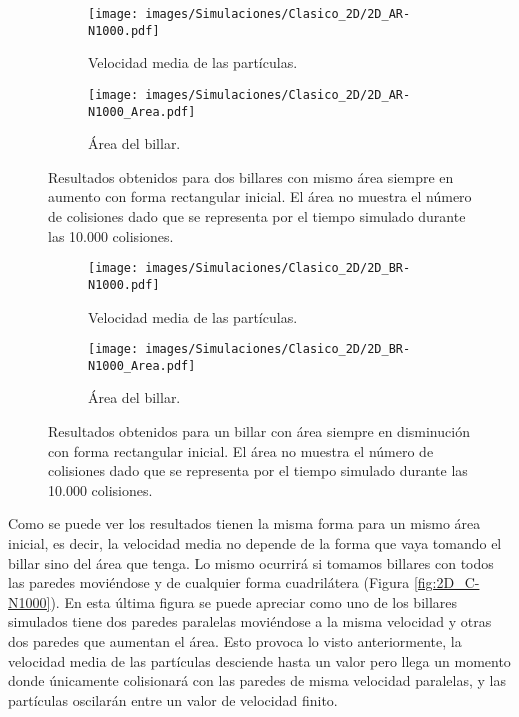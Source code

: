 \documentclass[11pt, spanish]{book}
\begin{document}
\begin{figure}[H]
    \begin{subfigure}[b]{0.5\textwidth}
        \centering
        \texttt{[image: images/Simulaciones/Clasico\_2D/2D\_AR-N1000.pdf]}
        \caption{Velocidad media de las partículas.}
    \end{subfigure}
    \hfill
    \begin{subfigure}[b]{0.5\textwidth}
        \centering
        \texttt{[image: images/Simulaciones/Clasico\_2D/2D\_AR-N1000\_Area.pdf]}
        \caption{Área del billar.}
    \end{subfigure}
    \caption{Resultados obtenidos para dos billares con mismo área siempre en aumento con forma rectangular inicial. El área no muestra el número de colisiones dado que se representa por el tiempo simulado durante las 10.000 colisiones.}
    \label{fig:2D_AR-N1000_con_Area}
\end{figure}

\begin{figure}[h]
    \begin{subfigure}[b]{0.5\textwidth}
        \centering
        \texttt{[image: images/Simulaciones/Clasico\_2D/2D\_BR-N1000.pdf]}
        \caption{Velocidad media de las partículas.}
    \end{subfigure}
    \hfill
    \begin{subfigure}[b]{0.5\textwidth}
        \centering
        \texttt{[image: images/Simulaciones/Clasico\_2D/2D\_BR-N1000\_Area.pdf]}
        \caption{Área del billar.}
    \end{subfigure}
    \caption{Resultados obtenidos para un billar con área siempre en disminución con forma rectangular inicial. El área no muestra el número de colisiones dado que se representa por el tiempo simulado durante las 10.000 colisiones.}
    \label{fig:2D_BR-N1000_con_Area}
\end{figure}

Como se puede ver los resultados tienen la misma forma para un mismo área inicial, es decir, la velocidad media no depende de la forma que vaya tomando el billar sino del área que tenga. Lo mismo ocurrirá si tomamos billares con todos las paredes moviéndose y de cualquier forma cuadrilátera (Figura \ref{fig:2D_C-N1000}). En esta última figura se puede apreciar como uno de los billares simulados tiene dos paredes paralelas moviéndose a la misma velocidad y otras dos paredes que aumentan el área. Esto provoca lo visto anteriormente, la velocidad media de las partículas desciende hasta un valor pero llega un momento donde únicamente colisionará con las paredes de misma velocidad paralelas, y las partículas oscilarán entre un valor de velocidad finito. 
\end{document}
